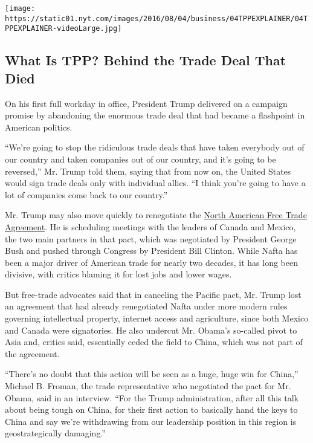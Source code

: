 \href{https://www.nytimes.com/interactive/2016/business/tpp-explained-what-is-trans-pacific-partnership.html}{}

\texttt{[image: https://static01.nyt.com/images/2016/08/04/business/04TPPEXPLAINER/04TPPEXPLAINER-videoLarge.jpg]}

\hypertarget{what-is-tpp-behind-the-trade-deal-that-died}{%
\subsection{What Is TPP? Behind the Trade Deal That
Died}\label{what-is-tpp-behind-the-trade-deal-that-died}}

On his first full workday in office, President Trump delivered on a
campaign promise by abandoning the enormous trade deal that had became a
flashpoint in American politics.

``We're going to stop the ridiculous trade deals that have taken
everybody out of our country and taken companies out of our country, and
it's going to be reversed,'' Mr. Trump told them, saying that from now
on, the United States would sign trade deals only with individual
allies. ``I think you're going to have a lot of companies come back to
our country.''

Mr. Trump may also move quickly to renegotiate the
\href{https://www.nytimes.com/2016/10/04/upshot/donald-trump-trashes-nafta-but-unwinding-it-would-come-at-a-huge-cost.html}{North
American Free Trade Agreement}. He is scheduling meetings with the
leaders of Canada and Mexico, the two main partners in that pact, which
was negotiated by President George Bush and pushed through Congress by
President Bill Clinton. While Nafta has been a major driver of American
trade for nearly two decades, it has long been divisive, with critics
blaming it for lost jobs and lower wages.

But free-trade advocates said that in canceling the Pacific pact, Mr.
Trump lost an agreement that had already renegotiated Nafta under more
modern rules governing intellectual property, internet access and
agriculture, since both Mexico and Canada were signatories. He also
undercut Mr. Obama's so-called pivot to Asia and, critics said,
essentially ceded the field to China, which was not part of the
agreement.

``There's no doubt that this action will be seen as a huge, huge win for
China,'' Michael B. Froman, the trade representative who negotiated the
pact for Mr. Obama, said in an interview. ``For the Trump
administration, after all this talk about being tough on China, for
their first action to basically hand the keys to China and say we're
withdrawing from our leadership position in this region is
geostrategically damaging.''

